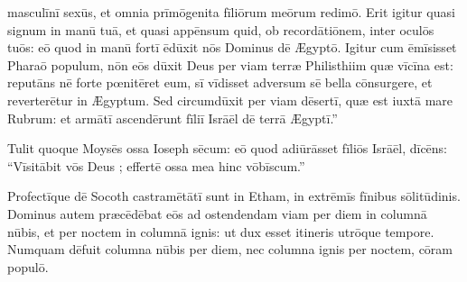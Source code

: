 masculīnī sexūs, et omnia prīmōgenita fīliōrum meōrum
redimō. Erit igitur quasi signum in manū tuā, et quasi
appēnsum quid, ob
recordātiōnem, inter
oculōs tuōs: eō quod in manū fortī ēdūxit nōs Dominus dē Ægyptō. Igitur
cum ēmīsisset Pharaō populum, nōn eōs dūxit Deus per viam terræ Philisthiim
quæ vīcīna est: reputāns nē forte
pœnitēret eum, sī vīdisset adversum sē bella
cōnsurgere, et reverterētur in Ægyptum. Sed
circumdūxit per viam dēsertī, quæ est iuxtā mare Rubrum:
et armātī ascendērunt fīliī Isrāēl dē terrā Ægyptī.''

Tulit quoque Moysēs
ossa Ioseph sēcum: eō quod adiūrāsset fīliōs Isrāēl,
dīcēns: ``Vīsitābit vōs Deus ;
effertē ossa mea hinc vōbīscum.''

Profectīque dē Socoth castramētātī sunt in Etham, in
extrēmīs fīnibus sōlitūdinis. Dominus autem præcēdēbat
eōs ad ostendendam viam per diem in columnā nūbis, et per noctem in columnā
ignis: ut dux esset itineris utrōque tempore. Numquam dēfuit columna
nūbis per diem, nec columna ignis per noctem, cōram populō. 
